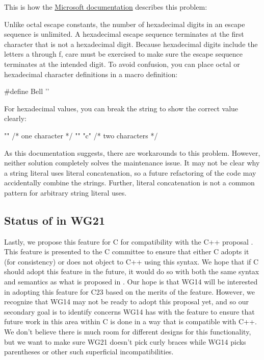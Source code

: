 \documentclass{wg21}
\begin{document}
This is how the \href{https://docs.microsoft.com/en-us/cpp/c-language/octal-and-hexadecimal-character-specifications?view=msvc-160}{Microsoft documentation} describes this problem:

\begin{quoteblock}

    Unlike octal escape constants, the number of hexadecimal digits in an escape sequence is unlimited. A hexadecimal escape sequence terminates at the first character that is not a hexadecimal digit. Because hexadecimal digits include the letters a through f, care must be exercised to make sure the escape sequence terminates at the intended digit. To avoid confusion, you can place octal or hexadecimal character definitions in a macro definition:

    \begin{colorblock}
        #define Bell ''
    \end{colorblock}

    For hexadecimal values, you can break the string to show the correct value clearly:

    \begin{colorblock}
        "\xabc"    /* one character  */
        "\xab" "c" /* two characters */
    \end{colorblock}

\end{quoteblock}

As this documentation suggests, there are workarounds to this problem. However, neither solution completely solves the maintenance issue. It may not be clear why a string literal uses literal concatenation, so a future refactoring of the code may accidentally combine the strings. Further, literal concatenation is not a common pattern for arbitrary string literal uses.

\subsection{Status of  in WG21}

Lastly, we propose this feature for C for compatibility with the C++ proposal .
This feature is presented to the C committee to ensure that either C adopts it (for consistency) or does not object to C++ using this syntax.
We hope that if C should adopt this feature in the future, it would do so with both the same syntax and semantics as what is proposed in
.
Our hope is that WG14 will be interested in adopting this feature for C23 based on the merits of the feature. However, we recognize that WG14 may not be ready to adopt this proposal yet, and so our secondary goal is to identify concerns WG14 has with the feature to ensure that future work in this area within C is done in a way that is compatible with C++. We don't believe there is much room for different designs for this functionality, but we want to make sure WG21 doesn't pick curly braces while WG14 picks parentheses or other such superficial incompatibilities.
\end{document}
